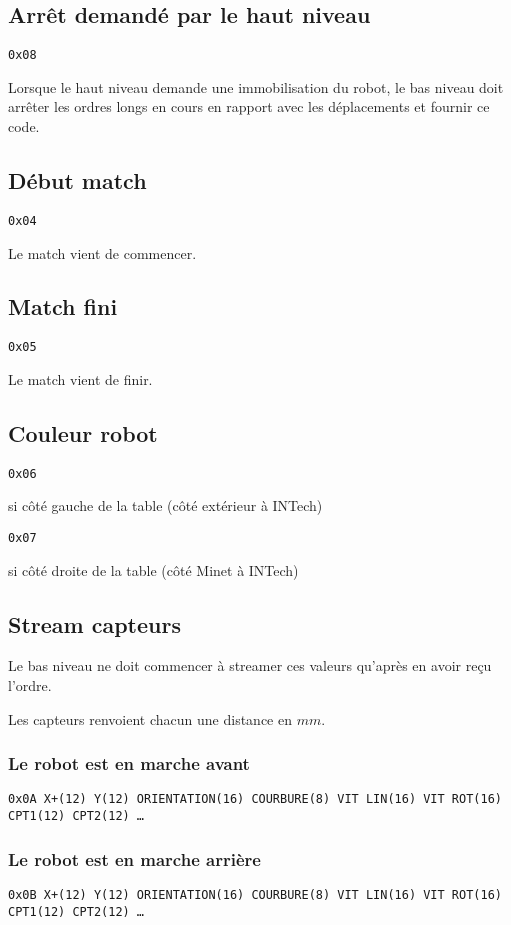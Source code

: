 \documentclass[a4paper, 12pt]{article}
\begin{document}
\subsection{Arrêt demandé par le haut niveau}
    \texttt{0x08}
    
Lorsque le haut niveau demande une immobilisation du robot, le bas niveau doit arrêter les ordres longs en cours en rapport avec les déplacements et fournir ce code.
    
\subsection{Début match}
    \texttt{0x04}

Le match vient de commencer.
    
\subsection{Match fini}
    \texttt{0x05}
    
Le match vient de finir.
    
\subsection{Couleur robot}
    \texttt{0x06}
    
    si côté gauche de la table (côté extérieur à INTech)
    
    \texttt{0x07}
    
    si côté droite de la table (côté Minet à INTech)
    
\subsection{Stream capteurs}

Le bas niveau ne doit commencer à streamer ces valeurs qu'après en avoir reçu l'ordre.

Les capteurs renvoient chacun une distance en $mm$.

\subsubsection{Le robot est en marche avant}
    \texttt{0x0A X+(12) Y(12) ORIENTATION(16) COURBURE(8) VIT  LIN(16) VIT  ROT(16) CPT1(12) CPT2(12) …}
    
\subsubsection{Le robot est en marche arrière}
    \texttt{0x0B X+(12) Y(12) ORIENTATION(16) COURBURE(8) VIT  LIN(16) VIT  ROT(16) CPT1(12) CPT2(12) …}
\end{document}

